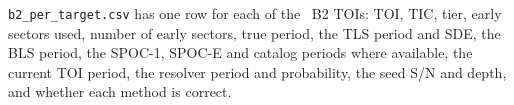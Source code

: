 \documentclass[twocolumn,linenumbers]{aastex701}
\begin{document}
\texttt{b2\_per\_target.csv} has one row for each of the \bTwoN\ B2 TOIs: TOI, TIC, tier, early sectors used, number of early sectors, true period, the TLS period and SDE, the BLS period, the SPOC-1, SPOC-E and catalog periods where available, the current TOI period, the resolver period and probability, the seed S/N and depth, and whether each method is correct.

{}

\end{document}
